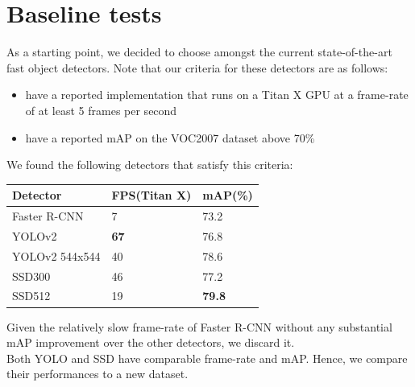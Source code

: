 \documentclass[10pt,twocolumn,letterpaper]{article}
\begin{document}
\section{Baseline tests}
As a starting point, we decided to choose amongst the current state-of-the-art fast object detectors. Note that our criteria for these detectors are as follows:
\begin{itemize}
	\item have a reported implementation that runs on a Titan X GPU at a frame-rate of at least 5 frames per second
	\item have a reported mAP on the VOC2007\cite{everingham2010pascal} dataset above 70\%
\end{itemize}
We found the following detectors that satisfy this criteria:
\begin{center}
    \begin{tabular}{ | l | l | p{2cm}|}
    \hline
    Detector & FPS(Titan X) & mAP(\%)\\ 
    \hline
    Faster R-CNN\cite{DBLP:journals/corr/RenHG015} & 7 & 73.2\\
    YOLOv2\cite{DBLP:journals/corr/RedmonF16} & \textbf{67} & 76.8\\
    YOLOv2 544x544\cite{DBLP:journals/corr/RedmonF16} & 40 & 78.6\\
    SSD300\cite{liu2016ssd} & 46 & 77.2\\
    SSD512\cite{liu2016ssd} & 19 & \textbf{79.8}\\
    \hline
    \end{tabular}
\end{center}
Given the relatively slow frame-rate of Faster R-CNN without any substantial mAP improvement over the other detectors, we discard it.\\
Both YOLO and SSD have comparable frame-rate and mAP. Hence, we compare their performances to a new dataset.
\end{document}
